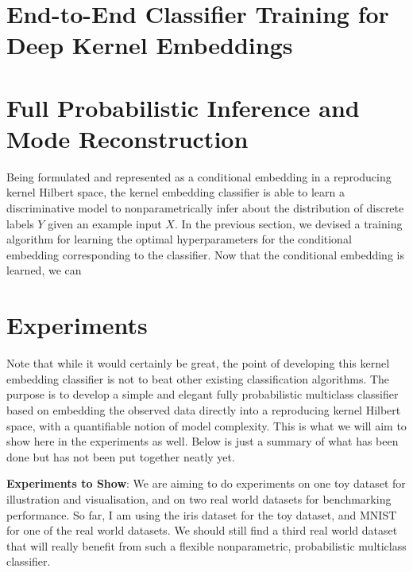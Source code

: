 \documentclass{article}
\newcommand{\note}[1]{{\color{orange} #1}}
\begin{document}
\section{End-to-End Classifier Training for Deep Kernel Embeddings}
\label{sec:deep_kernel_embeddings}

\section{Full Probabilistic Inference and Mode Reconstruction}
\label{sec:mode_reconstruction}

	Being formulated and represented as a conditional embedding in a reproducing kernel Hilbert space, the kernel embedding classifier is able to learn a discriminative model to nonparametrically infer about the distribution of discrete labels $Y$ given an example input $X$. In the previous section, we devised a training algorithm for learning the optimal hyperparameters for the conditional embedding corresponding to the classifier. Now that the conditional embedding is learned, we can 

\section{Experiments}

	\note{Note that while it would certainly be great, the point of developing this kernel embedding classifier is not to beat other existing classification algorithms. The purpose is to develop a simple and elegant fully probabilistic multiclass classifier based on embedding the observed data directly into a reproducing kernel Hilbert space, with a quantifiable notion of model complexity. This is what we will aim to show here in the experiments as well. Below is just a summary of what has been done but has not been put together neatly yet.}
	
	\textbf{Experiments to Show}: We are aiming to do experiments on one toy dataset for illustration and visualisation, and on two real world datasets for benchmarking performance. So far, I am using the iris dataset for the toy dataset, and MNIST for one of the real world datasets. We should still find a third real world dataset that will really benefit from such a flexible nonparametric, probabilistic multiclass classifier.
	
\end{document}
